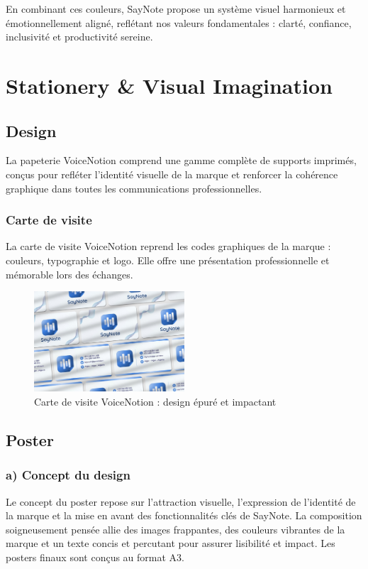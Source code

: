 En combinant ces couleurs, SayNote propose un système visuel harmonieux et émotionnellement aligné, reflétant nos valeurs fondamentales : clarté, confiance, inclusivité et productivité sereine.

\section{Stationery \& Visual Imagination}
\subsection{Design}
La papeterie VoiceNotion comprend une gamme complète de supports imprimés, conçus pour refléter l'identité visuelle de la marque et renforcer la cohérence graphique dans toutes les communications professionnelles.

\subsubsection*{Carte de visite}
La carte de visite VoiceNotion reprend les codes graphiques de la marque : couleurs, typographie et logo. Elle offre une présentation professionnelle et mémorable lors des échanges.
\begin{figure}[H]
    \centering
    \includegraphics[width=0.5\textwidth]{docs/visual-indentity/pictures/card.jpg}
    \caption{Carte de visite VoiceNotion : design épuré et impactant}
\end{figure}

\subsection{Poster}
\subsubsection*{a) Concept du design}
Le concept du poster repose sur l'attraction visuelle, l'expression de l'identité de la marque et la mise en avant des fonctionnalités clés de SayNote. La composition soigneusement pensée allie des images frappantes, des couleurs vibrantes de la marque et un texte concis et percutant pour assurer lisibilité et impact. Les posters finaux sont conçus au format A3.

